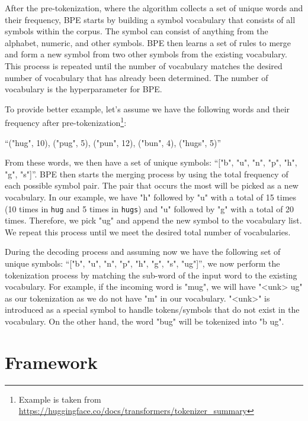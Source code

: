 After the pre-tokenization, where the algorithm collects a set of unique words and their frequency, BPE starts by building a symbol vocabulary that consists of all symbols within the corpus. The symbol can consist of anything from the alphabet, numeric, and other symbols. BPE then learns a set of rules to merge and form a new symbol from two other symbols from the existing vocabulary. This process is repeated until the number of vocabulary matches the desired number of vocabulary that has already been determined. The number of vocabulary is the hyperparameter for BPE.

To provide better example, let's assume we have the following words and their frequency after pre-tokenization\footnote{Example is taken from \url{https://huggingface.co/docs/transformers/tokenizer_summary}}:

\bigskip
``("hug", 10), ("pug", 5), ("pun", 12), ("bun", 4), ("hugs", 5)''
\bigskip

From these words, we then have a set of unique symbols: ``["b", "u", "n", "p", "h", "g", "s"]''. BPE then starts the merging process by using the total frequency of each possible symbol pair. The pair that occurs the most will be picked as a new vocabulary. In our example, we have "h" followed by "u" with a total of 15 times (10 times in \texttt{hug} and 5 times in \texttt{hugs}) and "u" followed by "g" with a total of 20 times. Therefore, we pick "ug" and append the new symbol to the vocabulary list. We repeat this process until we meet the desired total number of vocabularies.

During the decoding process and assuming now we have the following set of unique symbols: ``["b", "u", "n", "p", "h", "g", "s", "ug"]'', we now perform the tokenization process by matching the sub-word of the input word to the existing vocabulary. For example, if the incoming word is "mug", we will have "<unk> ug" as our tokenization as we do not have "m" in our vocabulary. "<unk>" is introduced as a special symbol to handle tokens/symbols that do not exist in the vocabulary. On the other hand, the word "bug" will be tokenized into "b ug".

\section{Framework}
\label{sec:framework}
